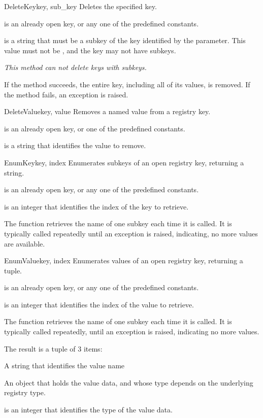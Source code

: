 \begin{funcdesc}{DeleteKey}{key, sub_key}
 Deletes the specified key.

  is an already open key, or any one of the predefined 
  constants.
 
  is a string that must be a subkey of the key 
 identified by the  parameter.  This value must not be 
 , and the key may not have subkeys.

 \emph{This method can not delete keys with subkeys.}

 If the method succeeds, the entire key, including all of its values,
 is removed.  If the method fails, an  
 exception is raised.
\end{funcdesc}


\begin{funcdesc}{DeleteValue}{key, value}
  Removes a named value from a registry key.
  
  is an already open key, or one of the predefined 
  constants.
  
  is a string that identifies the value to remove.
\end{funcdesc}


\begin{funcdesc}{EnumKey}{key, index}
  Enumerates subkeys of an open registry key, returning a string.

  is an already open key, or any one of the predefined 
  constants.

  is an integer that identifies the index of the key to 
 retrieve.

 The function retrieves the name of one subkey each time it 
 is called.  It is typically called repeatedly until an 
  exception 
 is raised, indicating, no more values are available.
\end{funcdesc}


\begin{funcdesc}{EnumValue}{key, index}
  Enumerates values of an open registry key, returning a tuple.
  
  is an already open key, or any one of the predefined 
  constants.
 
  is an integer that identifies the index of the value 
 to retrieve.
 
 The function retrieves the name of one subkey each time it is 
 called. It is typically called repeatedly, until an 
  exception is raised, indicating 
 no more values.
 
 The result is a tuple of 3 items:
 \item[value_name]
 A string that identifies the value name
 \item[value_data]
 An object that holds the value data, and whose type depends
 on the underlying registry type.
 \item[data_type] is an integer that identifies the type of the 
 value data.

\end{funcdesc}


